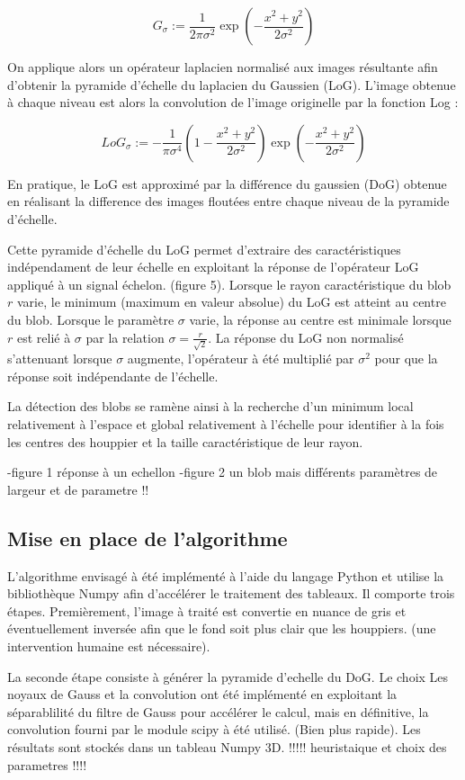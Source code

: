 \documentclass{article}
\begin{document}
	\[G_{\sigma}:=\frac{1}{2\pi\sigma^{2}}\exp(-\frac{x^{2}+y^{2}}{2\sigma^{2}})\]

	On applique alors un opérateur laplacien normalisé aux images résultante afin d'obtenir la pyramide d'échelle du laplacien du Gaussien (LoG). L'image obtenue à chaque niveau est alors la convolution de l'image originelle par la fonction Log :


	\[{LoG}_{\sigma}:=-\frac{1}{\pi\sigma^{4}}(1-\frac{x^{2}+y^{2}}{2\sigma^{2}})\exp(-\frac{x^{2}+y^{2}}{2\sigma^{2}})\] 

	En pratique, le LoG est approximé par la différence du gaussien (DoG) obtenue en réalisant la difference des images floutées entre chaque niveau de la pyramide d'échelle.  

	Cette pyramide d'échelle du LoG permet d'extraire des caractéristiques indépendament de leur échelle en exploitant la réponse de l'opérateur LoG appliqué à un signal échelon. (figure 5). Lorsque le rayon caractéristique du blob $r$ varie, le minimum (maximum en valeur absolue) du LoG est atteint au centre du blob. Lorsque le paramètre $\sigma$ varie, la réponse au centre est minimale lorsque $r$ est relié à $\sigma$ par la relation $\sigma=\frac{r}{\sqrt{2}}$. La réponse du LoG non normalisé s'attenuant lorsque $\sigma$ augmente, l'opérateur à été multiplié par $\sigma^{2}$ pour que la réponse soit indépendante de l'échelle.

	La détection des blobs se ramène ainsi à la recherche d'un minimum local relativement à l'espace et global relativement à l'échelle pour identifier à la fois les centres des houppier et la taille caractéristique de leur rayon. 
	
	-figure 1 réponse à un echellon 
	-figure 2 un blob mais différents paramètres de largeur et de parametre !!
	
	
	\subsection{Mise en place de l'algorithme}

	L'algorithme envisagé à été implémenté à l'aide du langage Python et utilise la bibliothèque Numpy afin d'accélérer le traitement des tableaux. Il comporte trois étapes. Premièrement, l'image à traité est convertie en nuance de gris et éventuellement inversée afin que le fond soit plus clair que les houppiers. (une intervention humaine est nécessaire). 
	
	La seconde étape consiste à générer la pyramide d'echelle du DoG. Le choix Les noyaux de Gauss et la convolution ont été implémenté en exploitant la séparablilité du filtre de Gauss pour accélérer le calcul, mais en définitive, la convolution fourni par le module scipy à été utilisé. (Bien plus rapide). Les résultats sont stockés dans un tableau Numpy 3D. !!!!! heuristaique et choix des parametres !!!! 
\end{document}
